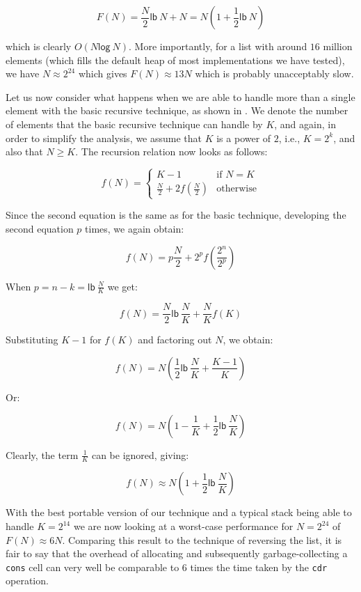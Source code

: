 \[ F(N) = \frac{N}{2}\mathsf{lb}~N + N = N(1 + \frac{1}{2}\mathsf{lb}~N)\]

which is clearly $O(N\mathsf{log}~N)$.  More importantly, for a list
with around $16$ million elements (which fills the default heap of most
implementations we have tested), we have $N \approx 2^{24}$ which
gives $F(N) \approx 13N$ which is probably unacceptably slow.

Let us now consider what happens when we are able to handle more than
a single element with the basic recursive technique, as shown in
.  We denote the number of elements that the
basic recursive technique can handle by $K$, and again, in order to
simplify the analysis, we assume that $K$ is a power of $2$, i.e., $K
= 2^k$, and also that $N \ge K$.  The recursion relation now looks as
follows:

\[ f(N) = \left\{ \begin{array}{ll}
                    K-1 & \mbox{if $N = K$} \\
                    \frac{N}{2} + 2f(\frac{N}{2}) &\mbox{otherwise}
                  \end{array} \right. \]

Since the second equation is the same as for the basic technique,
developing the second equation $p$ times, we again obtain:

\[ f(N) = p\frac{N}{2} + 2^pf(\frac{2^n}{2^p})\]

When $p = n - k = \mathsf{lb}~\frac{N}{K}$ we get:

\[ f(N) = \frac{N}{2}\mathsf{lb}~\frac{N}{K} + \frac{N}{K}f(K)\]

Substituting $K-1$ for $f(K)$ and factoring out $N$, we obtain:

\[ f(N) = N(\frac{1}{2}\mathsf{lb}~\frac{N}{K} + \frac{K - 1}{K})\]

Or:

\[ f(N) = N(1 - \frac{1}{K} + \frac{1}{2}\mathsf{lb}~\frac{N}{K})\]

Clearly, the term $\frac{1}{K}$ can be ignored, giving:

\[ f(N) \approx N(1 + \frac{1}{2}\mathsf{lb}~\frac{N}{K})\]

With the best portable version of our technique and a typical stack
being able to handle $K = 2^{14}$ we are now looking at a worst-case
performance for $N = 2^{24}$ of $F(N) \approx 6N$.  Comparing this
result to the technique of reversing the list, it is fair to say that
the overhead of allocating and subsequently garbage-collecting a
\texttt{cons} cell can very well be comparable to $6$ times the time
taken by the \texttt{cdr} operation.

